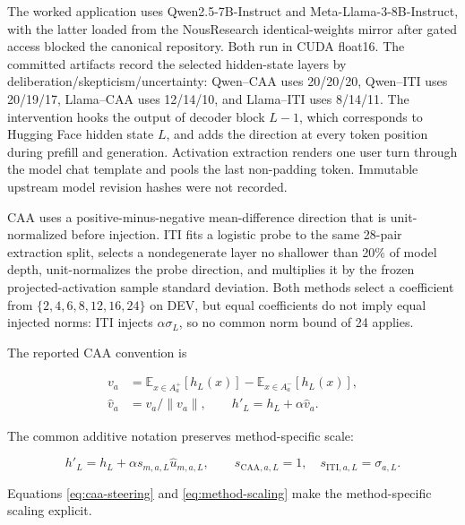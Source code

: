 \documentclass[manuscript,review,anonymous]{acmart}
\begin{document}
The worked application uses Qwen2.5-7B-Instruct and Meta-Llama-3-8B-Instruct, with the latter loaded from the NousResearch identical-weights mirror after gated access blocked the canonical repository. {}%
{}%
Both run in CUDA float16. The committed artifacts record the selected hidden-state layers by deliberation/skepticism/uncertainty: Qwen--CAA uses 20/20/20, Qwen--ITI uses 20/19/17, Llama--CAA uses 12/14/10, and Llama--ITI uses 8/14/11. The intervention hooks the output of decoder block \(L-1\), which corresponds to Hugging Face hidden state \(L\), and adds the direction at every token position during prefill and generation. Activation extraction renders one user turn through the model chat template and pools the last non-padding token. Immutable upstream model revision hashes were not recorded.

CAA uses a positive-minus-negative mean-difference direction that is unit-normalized before injection. {}%
{}%
ITI fits a logistic probe to the same 28-pair extraction split, selects a nondegenerate layer no shallower than 20\% of model depth, unit-normalizes the probe direction, and multiplies it by the frozen projected-activation sample standard deviation. {}%
Both methods select a coefficient from \(\{2,4,6,8,12,16,24\}\) on DEV, but equal coefficients do not imply equal injected norms: ITI injects \(\alpha\sigma_L\), so no common norm bound of 24 applies. {}%
{}%

The reported CAA convention is

\begin{equation}
\begin{aligned}
v_a &= \mathbb{E}_{x\in A_a^+}[h_L(x)]-\mathbb{E}_{x\in A_a^-}[h_L(x)],\\
\hat v_a &= v_a/\lVert v_a\rVert, \qquad h'_L=h_L+\alpha\hat v_a.
\end{aligned}
\label{eq:caa-steering}
\end{equation}

The common additive notation preserves method-specific scale:

\begin{equation}
h'_L=h_L+\alpha s_{m,a,L}\hat u_{m,a,L},\qquad
s_{\mathrm{CAA},a,L}=1,\quad s_{\mathrm{ITI},a,L}=\sigma_{a,L}.
\label{eq:method-scaling}
\end{equation}


Equations \ref{eq:caa-steering} and \ref{eq:method-scaling} make the method-specific scaling explicit.
\end{document}
